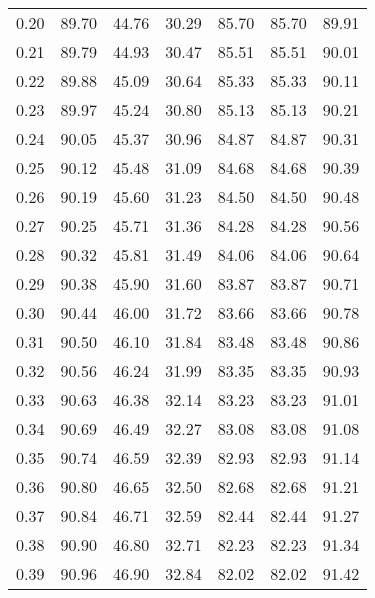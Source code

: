 \begin{tabular}{|c|c|c|c|c|c|c|}
      0.20 &     89.70 &     44.76 &      30.29 &   85.70 &      85.70 &         89.91 \\
      0.21 &     89.79 &     44.93 &      30.47 &   85.51 &      85.51 &         90.01 \\
      0.22 &     89.88 &     45.09 &      30.64 &   85.33 &      85.33 &         90.11 \\
      0.23 &     89.97 &     45.24 &      30.80 &   85.13 &      85.13 &         90.21 \\
      0.24 &     90.05 &     45.37 &      30.96 &   84.87 &      84.87 &         90.31 \\
      0.25 &     90.12 &     45.48 &      31.09 &   84.68 &      84.68 &         90.39 \\
      0.26 &     90.19 &     45.60 &      31.23 &   84.50 &      84.50 &         90.48 \\
      0.27 &     90.25 &     45.71 &      31.36 &   84.28 &      84.28 &         90.56 \\
      0.28 &     90.32 &     45.81 &      31.49 &   84.06 &      84.06 &         90.64 \\
      0.29 &     90.38 &     45.90 &      31.60 &   83.87 &      83.87 &         90.71 \\
      0.30 &     90.44 &     46.00 &      31.72 &   83.66 &      83.66 &         90.78 \\
      0.31 &     90.50 &     46.10 &      31.84 &   83.48 &      83.48 &         90.86 \\
      0.32 &     90.56 &     46.24 &      31.99 &   83.35 &      83.35 &         90.93 \\
      0.33 &     90.63 &     46.38 &      32.14 &   83.23 &      83.23 &         91.01 \\
      0.34 &     90.69 &     46.49 &      32.27 &   83.08 &      83.08 &         91.08 \\
      0.35 &     90.74 &     46.59 &      32.39 &   82.93 &      82.93 &         91.14 \\
      0.36 &     90.80 &     46.65 &      32.50 &   82.68 &      82.68 &         91.21 \\
      0.37 &     90.84 &     46.71 &      32.59 &   82.44 &      82.44 &         91.27 \\
      0.38 &     90.90 &     46.80 &      32.71 &   82.23 &      82.23 &         91.34 \\
      0.39 &     90.96 &     46.90 &      32.84 &   82.02 &      82.02 &         91.42 \\

\end{tabular}
